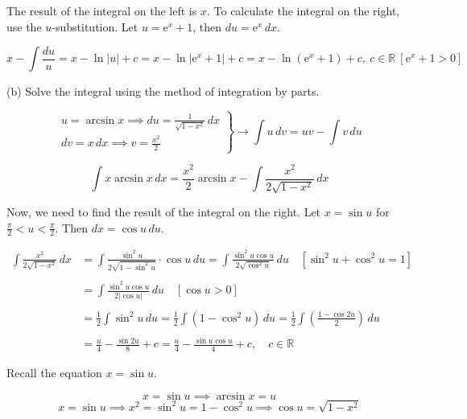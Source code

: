\documentclass{article}
\begin{document}
\hfill

\noindent The result of the integral on the left is $x$. To calculate the integral on the right, use the $u$-substitution. Let $u=\mathrm{e}^x+1$, then $du=\mathrm{e}^x\,dx$.

\[x-\int\frac{du}{u}=x-\ln|u|+c=\boxed{x-\ln\left|\mathrm{e}^x+1\right|+c=x-\ln\left(\mathrm{e}^x+1\right)+c,\:c\in\mathbb{R}}\:\left[\mathrm{e}^x+1>0\right]\]

\hfill

\noindent (b) Solve the integral using the method of integration by parts.

\[\left.\begin{array}{c}
\displaystyle u=\arcsin x\implies du=\frac1{\sqrt{1-x^2}}\,dx\\[1em]
\displaystyle dv=x\,dx\implies v=\frac{x^2}2
\end{array}\right\}\rightarrow\int u\,dv=uv-\int v\,du\]

\hfill

\begin{equation}\int x\arcsin x\,dx=\frac{x^2}2\arcsin x-\int\frac{x^2}{2\sqrt{1-x^2}}\,dx\end{equation}

\hfill

\noindent Now, we need to find the result of the integral on the right. Let $x=\sin u$ for $\displaystyle\frac\pi2<u<\frac\pi2$. Then $dx=\cos u\,du$.

\begin{align*}\int\frac{x^2}{2\sqrt{1-x^2}}\,dx&=\int\frac{\sin^2u}{2\sqrt{1-\sin^2u}}\cdot\cos u\,du=\int\frac{\sin^2u\cos u}{2\sqrt{\cos^2u}}\,du\quad\left[\sin^2 u+\cos^2u=1\right]\\\\&=\int\frac{\sin^2{u}\cos u}{2\left|\cos u\right|}\,du\quad\left[\cos u > 0\right]\\\\&=\frac12\int\sin^2u\,du=\frac12\int\left(1-\cos^2u\right)\,du=\frac12\int\left(\frac{1-\cos2u}2\right)\,du\\\\&=\frac u4-\frac{\sin2u}8+c=\frac u4-\frac{\sin u\cos u}4+c,\quad c\in\mathbb{R}\end{align*}

\hfill

\noindent Recall the equation $x=\sin u$.

\[x=\sin u\implies\arcsin x=u\]
\[x=\sin u\implies x^2=\sin^2u=1-\cos^2u\implies\cos u=\sqrt{1-x^2}\]
\end{document}
